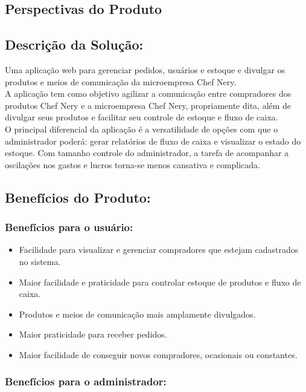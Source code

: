 \begin{apendicesenv}
{\large {\section { Perspectivas do Produto\\ } } }

\subsection{Descrição da Solução:}
Uma aplicação web para gerenciar pedidos, usuários e estoque e divulgar os produtos e meios de comunicação da microempresa Chef Nery. \\
\tab A aplicação tem como objetivo agilizar a comunicação entre compradores dos produtos Chef Nery e a microempresa Chef Nery, propriamente dita, além de divulgar seus produtos e facilitar seu controle de estoque e fluxo de caixa.\\
\tab O principal diferencial da aplicação é a  versatilidade de opções com que o administrador poderá: gerar relatórios de fluxo de caixa e visualizar o estado do estoque. Com tamanho controle do administrador, a tarefa de acompanhar a oscilações nos gastos e lucros torna-se menos cansativa e complicada.\\

\subsection{Benefícios do Produto:}
\subsubsection{Benefícios para o usuário:}
\begin{itemize}

\item Facilidade para visualizar e gerenciar compradores que estejam cadastrados no sistema.
\item Maior facilidade e praticidade para controlar estoque de produtos e fluxo de caixa.
\item Produtos e meios de comunicação mais amplamente divulgados.
\item Maior praticidade para receber pedidos.
\item Maior facilidade de conseguir novos compradores, ocasionais ou constantes.

\end{itemize}

\subsubsection{Benefícios para o administrador:}
\begin{itemize}


\end{itemize}
\end{apendicesenv}
